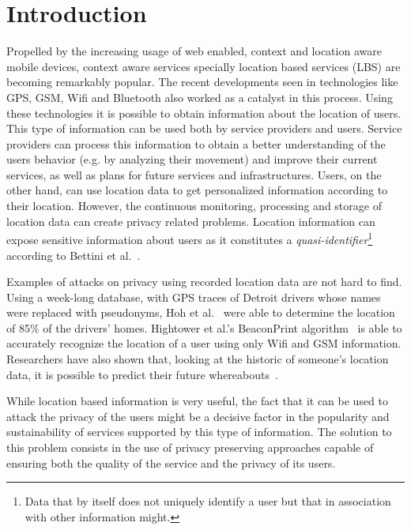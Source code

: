 \chapter{Introduction}
\label{cha:introduction}

Propelled by the increasing usage of web enabled, context and location
aware mobile devices, context aware services specially location based
services (LBS) are becoming remarkably popular. The recent
developments seen in technologies like GPS, GSM, Wifi and Bluetooth
also worked as a catalyst in this process. Using these technologies it
is possible to obtain information about the location of users. This
type of information can be used both by service providers and
users. Service providers can process this information to obtain a
better understanding of the users behavior (e.g. by analyzing their
movement) and improve their current services, as well as plans for
future services and infrastructures. Users, on the other hand, can use
location data to get personalized information according to their
location. However, the continuous monitoring, processing and storage
of location data can create privacy related problems. Location
information can expose sensitive information about users as it
constitutes a \emph{quasi-identifier}\footnote{Data that by itself
  does not uniquely identify a user but that in association with other
  information might.} according to Bettini et
al.~\cite{bettini2005protecting}.

Examples of attacks on privacy using recorded location data are not
hard to find. Using a week-long database, with GPS traces of Detroit
drivers whose names were replaced with pseudonyms, Hoh et
al.~\cite{hoh2006enhancing} were able to determine the location of
85\% of the drivers' homes. Hightower et al.'s BeaconPrint
algorithm~\cite{hightower2005learning} is able to accurately recognize
the location of a user using only Wifi and GSM
information. Researchers have also shown that, looking at the historic
of someone's location data, it is possible to predict their future
whereabouts~\cite{krumm2006predestination,froehlich2008route}.

While location based information is very useful, the fact that it can
be used to attack the privacy of the users might be a decisive factor
in the popularity and sustainability of services supported by this
type of information.  The solution to this problem consists in the use
of privacy preserving approaches capable of ensuring both the quality
of the service and the privacy of its users.


